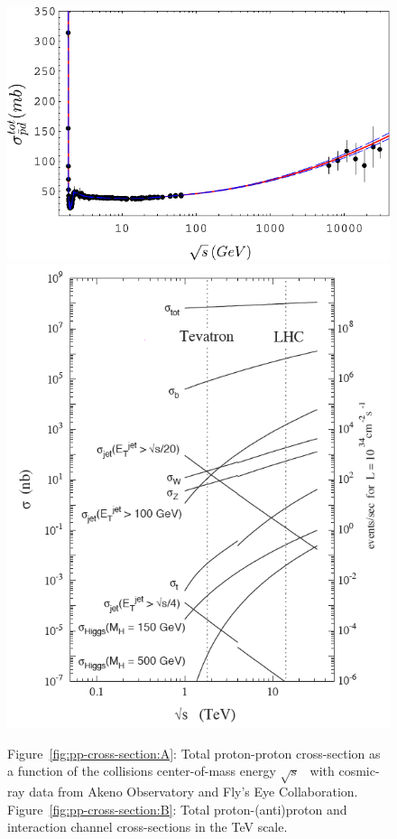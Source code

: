 	\begin{figure}
		\vspace{15pt}
		\begin{minipage}{\linewidth}
			\centering\captionsetup[subfigure]{justification=centering}
			\includegraphics[width=\linewidth]{fig/chapt2/pp-total-cross-section.pdf}
			\subcaption{\label{fig:pp-cross-section:A}}
			\includegraphics[width=\linewidth]{fig/chapt2/Cross-sections.png}
			\subcaption{\label{fig:pp-cross-section:B}}
		\end{minipage}
		\caption{\label{fig:pp-cross-section} Figure~\ref{fig:pp-cross-section:A}: Total proton-proton cross-section as a function of the collisions center-of-mass energy $\sqrt{s}$~\cite{ARKHIPOV2001} with cosmic-ray data from Akeno Observatory and Fly’s Eye Collaboration. Figure~\ref{fig:pp-cross-section:B}: Total proton-(anti)proton and interaction channel cross-sections in the \si{TeV} scale.}
	\end{figure}
	
